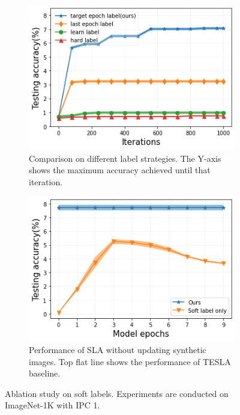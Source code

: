 \documentclass[10pt,twocolumn,letterpaper]{article}
\begin{document}
\begin{figure}
\vspace{-3mm}
\centering
\begin{subfigure}[t]{0.8\linewidth}
\centering
\includegraphics[width=\textwidth]{images/soft_hard_label.png}\centering
  \caption{Comparison on different label strategies. The Y-axis shows the maximum accuracy achieved until that iteration.}
  \label{fig.soft_hard}
\end{subfigure}
\begin{subfigure}[t]{0.8\linewidth}
\centering
\includegraphics[width=\textwidth]{images/soft_label_only.png}\centering
  \caption{Performance of SLA without updating synthetic images. Top flat line shows the performance of TESLA baseline.}
  \label{fig.soft_label_only}
\end{subfigure}
\caption{Ablation study on soft labels. Experiments are conducted on ImageNet-1K with IPC 1.}
\end{figure}
\end{document}
